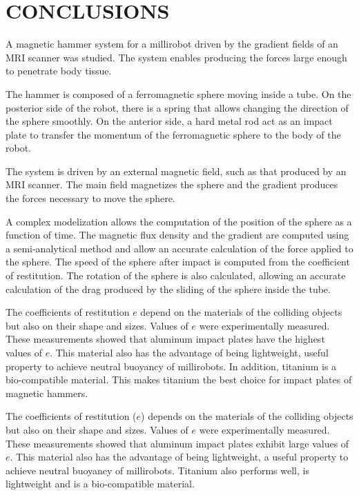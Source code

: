 \documentclass[letterpaper, 10 pt, conference]{ieeeconf}  %
\begin{document}
\section{CONCLUSIONS}
\label{conclusion}
A magnetic hammer system for a millirobot driven by the gradient fields of an MRI scanner was studied. 
The system enables producing the forces large enough to penetrate body tissue.\par
The hammer is composed of a ferromagnetic sphere moving inside a tube. 
On the posterior side of the robot, there is a spring that allows changing the direction of the sphere smoothly. 
On the anterior side, a hard metal rod act as an impact plate to transfer the momentum of the ferromagnetic sphere to the body of the robot.\par
The system is driven by an external magnetic field, such as that produced by an MRI scanner. 
The main field magnetizes the sphere and the gradient produces the forces necessary to move the sphere.\par
 A complex modelization allows the computation of the position of the sphere as a function of time. 
 The magnetic flux density and the gradient are computed using a semi-analytical method and allow an accurate calculation of the force applied to the sphere. 
 The speed of the sphere after impact is computed from the coefficient of restitution. 
 The rotation of the sphere is also calculated, allowing an accurate calculation of the drag produced by the sliding of the sphere inside the tube.\par

The coefficients of restitution $e$ depend on the materials of the colliding objects but also on their shape and sizes. 
Values of $e$ were experimentally measured. 
These measurements showed that aluminum impact plates have the highest values of $e$. 
This material also has the advantage of being lightweight, useful property to achieve neutral buoyancy of millirobots. 
In addition, titanium is a bio-compatible material. 
This makes titanium the best choice for impact plates of magnetic hammers.\par

The coefficients of restitution ($e$) depends on the materials of the colliding objects but also on their shape and sizes. 
Values of $e$ were experimentally measured. 
These measurements showed that aluminum impact plates exhibit large values of $e$. 
This material also has the advantage of being lightweight, a useful property to achieve neutral buoyancy of millirobots. 
Titanium also performs well, is lightweight and is a bio-compatible material.\par
\end{document}
